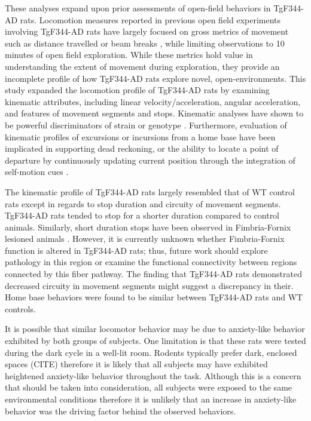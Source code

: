 \documentclass[fleqn,10pt]{wlscirep}
\begin{document}
These analyses expand upon prior assessments of open-field behaviors in TgF344-AD rats. Locomotion measures reported in previous open field experiments involving TgF344-AD rats have largely focused on gross metrics of movement such as distance travelled \cite{morrone_regional_2020,voorhees_occupational-like_2019,voorhees_-p7c3-s243_2018} or beam breaks \cite{cohen_transgenic_2013}, while limiting observations to 10 minutes of open field exploration. While these metrics hold value in understanding the extent of movement during exploration, they provide an incomplete profile of how TgF344-AD rats explore novel, open-environments. This study expanded the locomotion profile of TgF344-AD rats by examining kinematic attributes, including linear velocity/acceleration, angular acceleration, and features of movement segments and stops. Kinematic analyses have shown to be powerful discriminators of strain or genotype \cite{benjamini_ten_2010}. Furthermore, evaluation of kinematic profiles of excursions or incursions from a home base have been implicated in supporting dead reckoning, or the ability to locate a point of departure by continuously updating current position through the integration of self-motion cues \cite{wallace_fractionating_2008,wallace_movement_2006,wallace_quantification_2002}.


The kinematic profile of TgF344-AD rats largely resembled that of WT control rats except in regards to stop duration and circuity of movement segments. TgF344-AD rats tended to stop for a shorter duration compared to control animals. Similarly, short duration stops have been observed in Fimbria-Fornix lesioned animals \cite{whishaw_short-stops_1994}. However, it is currently unknown whether Fimbria-Fornix function is altered in TgF344-AD rats; thus, future work should explore pathology in this region or examine the functional connectivity between regions connected by this fiber pathway. The finding that TgF344-AD rats demonstrated decreased circuity in movement segments might suggest a discrepancy in their.  
Home base behaviors were found to be similar between TgF344-AD rats and WT controls.

It is possible that similar locomotor behavior may be due to anxiety-like behavior exhibited by both groups of subjects. One limitation is that these rats were tested during the dark cycle in a well-lit room. Rodents typically prefer dark, enclosed spaces (CITE) therefore it is likely that all subjects may have exhibited heightened anxiety-like behavior throughout the task. Although this is a concern that should be taken into consideration, all subjects were exposed to the same environmental conditions therefore it is unlikely that an increase in anxiety-like behavior was the driving factor behind the observed behaviors. 
\end{document}

